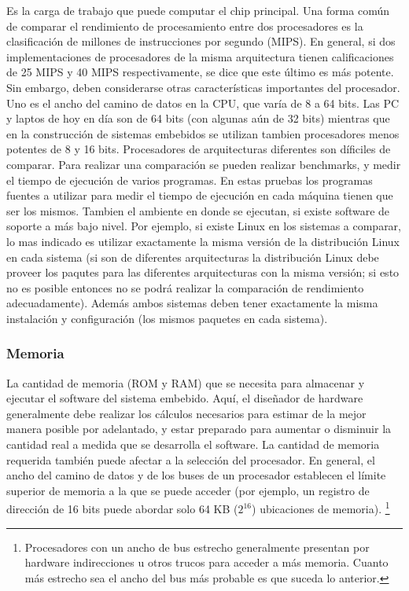 \documentclass[output=paper, 
colorlinks,
citecolor=brown,
newtxmath
]{langscibook}
\begin{document}
Es la carga de trabajo que puede computar el chip principal. 
Una forma común de comparar el rendimiento de procesamiento entre dos procesadores 
es la clasificación de millones de instrucciones por segundo (MIPS). En general,
si dos implementaciones de procesadores de la misma arquitectura tienen calificaciones 
de 25 MIPS y 40 MIPS respectivamente, se dice que este último es más potente. 
Sin embargo, deben considerarse otras características importantes del procesador. 
Uno es el ancho del camino de datos en la CPU, que varía de 8 a 64 bits. 
Las PC y laptos de hoy en día son de 64 bits (con algunas aún de 32 bits) 
mientras que en la construcción de sistemas embebidos
se utilizan tambien procesadores menos potentes de 8 y 16 bits.
Procesadores de arquitecturas diferentes son díficiles de comparar. Para
realizar una comparación se pueden realizar benchmarks, y medir el tiempo
de ejecución de varios programas. En estas pruebas los programas
fuentes a utilizar para medir el tiempo de ejecución en cada máquina
tienen que ser los mismos. Tambien el ambiente en donde se ejecutan,
si existe software de soporte a más bajo nivel. Por ejemplo, si existe
Linux en los sistemas a comparar, lo mas indicado es utilizar
exactamente la misma versión de la distribución Linux en cada
sistema (si son de diferentes arquitecturas la distribución Linux
debe proveer los paqutes para las diferentes arquitecturas con la misma versión;
si esto no es posible entonces no se podrá realizar la comparación de rendimiento
adecuadamente).
Además ambos sistemas deben tener exactamente la misma instalación y 
configuración (los mismos paquetes en cada sistema).


\subsubsection *{Memoria}

La cantidad de memoria (ROM y RAM) que se necesita para almacenar
y ejecutar el software del sistema embebido. Aquí, el diseñador de 
hardware generalmente debe realizar los cálculos necesarios para
estimar de la mejor manera posible por adelantado, y estar preparado para 
aumentar o disminuir la cantidad real a medida que se desarrolla el software. 
La cantidad de memoria requerida también puede afectar a la selección del 
procesador. En general, el ancho del camino de datos y de los buses de un procesador 
establecen el límite superior de memoria a la que se puede 
acceder (por ejemplo, un registro de dirección de 16 bits puede abordar solo 
64 KB ($2^{\text{16}}$) ubicaciones de memoria). \footnote{Procesadores 
con un ancho de bus estrecho generalmente presentan por hardware 
indirecciones u otros trucos para acceder a 
más memoria. Cuanto más estrecho sea el ancho del bus 
más probable es que suceda lo anterior.}
\end{document}
